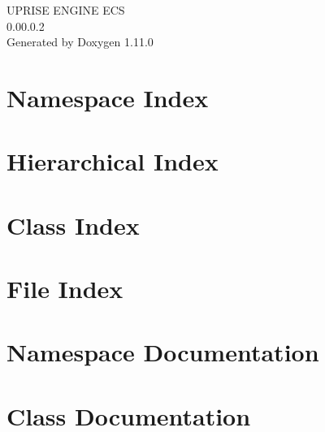\documentclass[twoside]{book}
\newcommand{\+}{\discretionary{\mbox{\scriptsize$\hookleftarrow$}}{}{}}
\newcommand{\clearemptydoublepage}{%
    \newpage{\pagestyle{empty}\cleardoublepage}%
  }
\begin{document}
  \raggedbottom
    \hypersetup{pageanchor=false,
                bookmarksnumbered=true,
                pdfencoding=unicode
               }
  \begin{titlepage}
  \vspace*{7cm}
  \begin{center}%
  {\Large UPRISE ENGINE ECS}\\
  [1ex]\large 0.\+00.\+0.\+2 \\
  \vspace*{1cm}
  {\large Generated by Doxygen 1.11.0}\\
  \end{center}
  \end{titlepage}
  \clearemptydoublepage
  \tableofcontents
  \clearemptydoublepage
  \hypersetup{pageanchor=true}
\chapter{Namespace Index}

\chapter{Hierarchical Index}

\chapter{Class Index}

\chapter{File Index}

\chapter{Namespace Documentation}



\chapter{Class Documentation}








\end{document}
